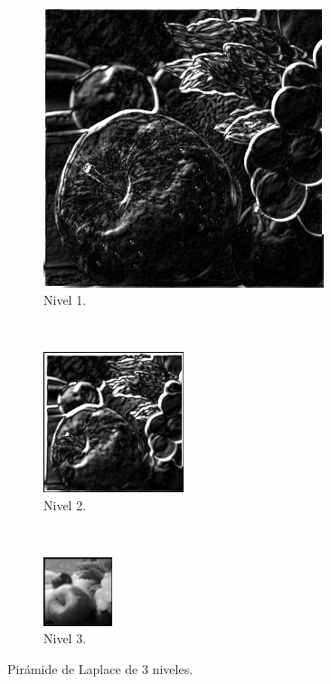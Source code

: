 \begin{figure}[H]
  \centering
  \begin{subfigure}[t]{0.32\textwidth}
    \centering
    \includegraphics[width = 0.9\textwidth]{piramides/lp1.png}
    \caption{Nivel 1.}
  \end{subfigure}
  ~
  \begin{subfigure}[t]{0.32\textwidth}
      \centering
      \includegraphics[width = 0.45\textwidth]{piramides/lp2.png}
      \caption{Nivel 2.}
  \end{subfigure}
  ~ 
  \begin{subfigure}[t]{0.32\textwidth}
      \centering
      \includegraphics[width = 0.22\textwidth]{piramides/lp3.png}
      \caption{Nivel 3.}
  \end{subfigure}
  \caption{Pirámide de Laplace de 3 niveles.}
  \label{fig:lp3frutas}
\end{figure}


